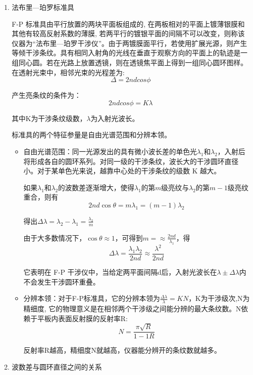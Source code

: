 \documentclass[dvipsnames, svgnames,a4paper,11pt]{article}
\begin{document}
	\begin{enumerate}
		\item 法布里—珀罗标准具

			F-P 标准具由平行放置的两块平面板组成的, 在两板相对的平面上镀薄银膜和其他有较高反射系数的薄膜, 若两平行的镀银平面的间隔不可以改变，则称该仪器为“法布里—珀罗干涉仪”。由于两镀膜面平行，若使用扩展光源，则产生等倾干涉条纹。具有相同入射角的光线在垂直于观察方向的平面上的轨迹是一组同心圆。若在光路上放置透镜，则在透镜焦平面上得到一组同心圆环图样。 在透射光束中，相邻光束的光程差为:
			\[
				\Delta = 2 n d cos \phi	
			\]

			产生亮条纹的条件为：
			\[
				2 n d cos \phi = K \lambda
			\]

			其中K为干涉条纹级数，$\lambda$为入射光波长。

			标准具的两个特征参量是自由光谱范围和分辨本领。
				
				\begin{itemize}
					\item 自由光谱范围：同一光源发出的具有微小波长差的单色光$\lambda_1$和$\lambda_2$，入射后将形成各自的圆环系列。对同一级的干涉条纹，波长大的干涉圆环直径小。对于某单色光来说，越靠中心处的干涉条纹的级数 K 越大。
					
					如果$\lambda_1$和$\lambda_2$的波数差逐渐增大，使得$\lambda_1$的第$m$级亮纹与$\lambda_2$的第$m - 1$级亮纹重合，则有
					\[
						2 n d \cos \theta = m \lambda _1 = (m - 1)\lambda_2	
					\]

					得出$\Delta \lambda = \lambda _2 - \lambda_1 = \frac{\lambda_2}{m}$

					由于大多数情况下，$\cos \theta \approx 1$，可得到$m = \approx \frac{2 n d}{\lambda_1}$，得
					\[
						\Delta \lambda = \frac{\lambda_1 \lambda_2}{2 n d} \approx \frac{\lambda^2}{2 n d}	
					\]

					它表明在 F-P 干涉仪中，当给定两平面间隔d后，入射光波长在$\lambda \pm \Delta \lambda$内不会发生干涉圆环重叠。

					\item 分辨本领：对于F-P标准具，它的分辨本领为$\frac{\Delta \lambda}{\lambda} = K N$，K为干涉级次,N为精细度, 它的物理意义是在相邻两个干涉级之间能分辨的最大条纹数。N依赖于平板内表面反射膜的反射率R:
					\[
						N = \frac{\pi \sqrt{R}}{1 -1R}	
					\]

					反射率R越高，精细度N就越高，仪器能分辨开的条纹数就越多。

				\end{itemize}

		\item 波数差与圆环直径之间的关系
		

\end{enumerate}
\end{document}

